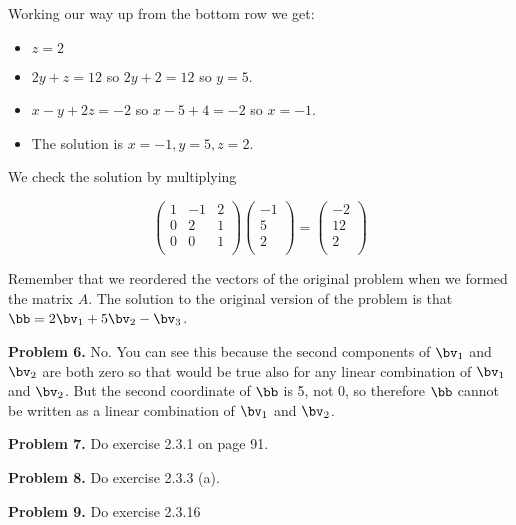 \documentclass[oneside,12pt]{amsart}
\begin{document}
Working our way up from the bottom row we get:
\begin{itemize}
\item $z = 2$
\item $2y + z = 12$ so $2y + 2 = 12$ so $y=5$.
\item $x - y + 2z = -2$ so $x - 5 + 4 = -2$ so $x= -1$.
\item The solution is $x=-1, y=5, z= 2$.
\end{itemize}

We check the solution by multiplying

$$
\begin{pmatrix}
1 & -1 & 2 \\
0 &  2 & 1 \\
0 &  0 & 1  \\
\end{pmatrix}
\begin{pmatrix}
-1 \\
5 \\
2 \\
\end{pmatrix}
=
\begin{pmatrix}
-2 \\
12 \\
2 \\
\end{pmatrix}
$$

Remember that we reordered the vectors of the original problem when we
formed the matrix $A$. The solution to the original version of the problem is
that $\bb = 2\bv_1  + 5 \bv_2 -\bv_3$.

\bigskip

\textbf{Problem 6.}  No. You can see this because the second components
of $\bv_1$ and $\bv_2$ are both zero so that would be true also for any linear
combination of $\bv_1$ and $\bv_2$. But the second coordinate of $\bb$ is 5,
not 0, so therefore $\bb$ cannot be written as a linear combination of $\bv_1$
and $\bv_2$.

\bigskip


\textbf{Problem 7.} Do exercise 2.3.1 on page 91.

\bigskip
\bigskip
\bigskip
\bigskip
\bigskip
\bigskip
\bigskip
\bigskip
\bigskip
\bigskip


\textbf{Problem 8.} Do exercise 2.3.3 (a).
\bigskip
\bigskip
\bigskip
\bigskip
\bigskip
\bigskip
\bigskip
\bigskip
\bigskip
\bigskip


\textbf{Problem 9.} Do exercise 2.3.16

\bigskip
\bigskip
\bigskip
\bigskip
\bigskip
\bigskip
\bigskip
\bigskip
\bigskip
\bigskip
\end{document}
